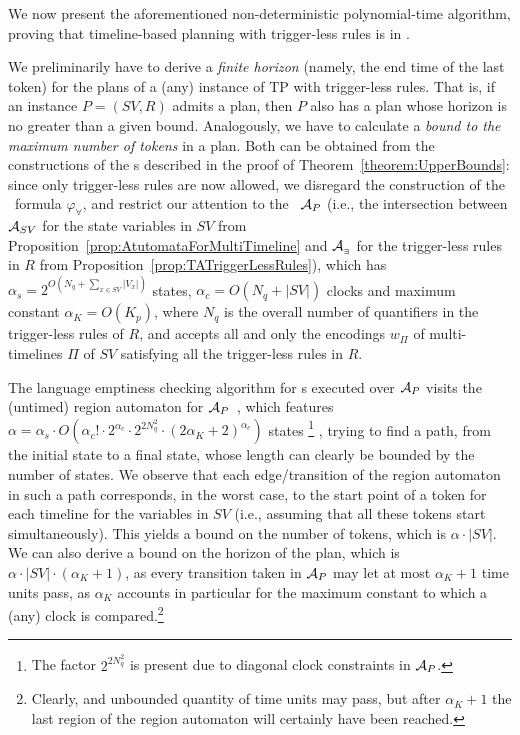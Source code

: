 We now present the aforementioned non-deterministic polynomial-time algorithm, proving that timeline-based planning with trigger-less rules is in \NP.

We preliminarily have to derive a \emph{finite horizon} (namely, the end time of the last token) for the plans of a (any) instance of TP with trigger-less rules. That is, 
if an instance $P=(SV,R)$ admits a plan, then $P$ also has a plan whose horizon is no greater than a given bound. Analogously, we have to calculate a \emph{bound to the maximum number of tokens} in a plan.
Both can be obtained from 
the constructions of the \TA s described in the proof of 
Theorem~\ref{theorem:UpperBounds}:
since only trigger-less rules are now allowed,
we disregard the construction of the \MTL\ formula $\varphi_\forall$,
and restrict our attention to the \TA\  
$\mathcal{A}_P$ (i.e., the intersection between $\mathcal{A}_{SV}$ for the state variables in $SV$ from Proposition~\ref{prop:AtutomataForMultiTimeline} and $\mathcal{A}_{_\exists}$ for the trigger-less rules in $R$ from Proposition~\ref{prop:TATriggerLessRules}), which has $\alpha_s=2^{O(N_q+\sum_{x\in SV} |V_x|)}$ states, $\alpha_c=O(N_q+|SV|)$ clocks and maximum constant $\alpha_K=O(K_p)$, where
$N_q$  is the overall number of quantifiers   in the trigger-less  rules of $R$, 
and accepts all and only the encodings $w_\Pi$ of multi-timelines $\Pi$ of $SV$ satisfying all the trigger-less rules in $R$.

The language emptiness checking algorithm for \TA s executed over $\mathcal{A}_P$ visits the (untimed) region automaton for $\mathcal{A}_P$~\cite{ALUR1994183},
which features $\alpha=\alpha_s\cdot O(\alpha_c!\cdot 2^{\alpha_c}\cdot 2^{2 N_q^2}\cdot (2\alpha_K +2)^{\alpha_c})$
states%
\footnote{The factor $2^{2 N_q^2}$ is present due to diagonal clock constraints in $\mathcal{A}_P$.}%
, trying to find a path, from the initial state to a final state, whose length can clearly be bounded by the number of states.
%
We observe that each edge/transition of the region automaton in such a path corresponds, in the worst case, to the start point of a token for each timeline for the variables in $SV$ (i.e., assuming that all these tokens start simultaneously).
This yields a bound on the number of tokens, which is $\alpha \cdot |SV|$.
We can also derive a bound on the horizon of the plan, which is $\alpha \cdot |SV| \cdot (\alpha_K+1)$, as every transition taken in $\mathcal{A}_P$ may let at most $\alpha_K+1$ time units pass, as $\alpha_K$ accounts in particular for the maximum constant to which a (any) clock is compared.\footnote{Clearly, and unbounded quantity of time units may pass, but after $\alpha_K+1$ the last region of the region automaton will certainly have been reached.}

